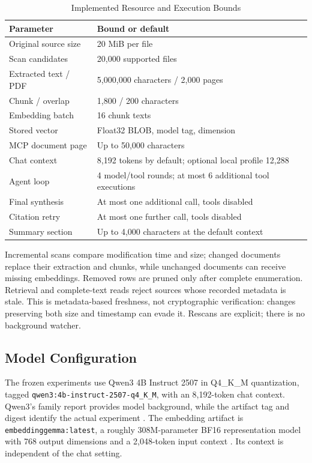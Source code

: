 \documentclass[conference,letterpaper]{IEEEtran}
\newcommand{\code}[1]{\texttt{#1}}
\begin{document}
\begin{table}[t]
\caption{Implemented Resource and Execution Bounds}
\label{tab:limits}
\centering\small
\begin{tabularx}{\columnwidth}{@{}lX@{}}
\toprule
Parameter & Bound or default \\
\midrule
Original source size & 20 MiB per file \\
Scan candidates & 20,000 supported files \\
Extracted text / PDF & 5,000,000 characters / 2,000 pages \\
Chunk / overlap & 1,800 / 200 characters \\
Embedding batch & 16 chunk texts \\
Stored vector & Float32 BLOB, model tag, dimension \\
MCP document page & Up to 50,000 characters \\
Chat context & 8,192 tokens by default; optional local profile 12,288 \\
Agent loop & 4 model/tool rounds; at most 6 additional tool executions \\
Final synthesis & At most one additional call, tools disabled \\
Citation retry & At most one further call, tools disabled \\
Summary section & Up to 4,000 characters at the default context \\
\bottomrule
\end{tabularx}
\end{table}

Incremental scans compare modification time and size; changed documents replace their extraction and chunks, while unchanged documents can receive missing embeddings. Removed rows are pruned only after complete enumeration. Retrieval and complete-text reads reject sources whose recorded metadata is stale. This is metadata-based freshness, not cryptographic verification: changes preserving both size and timestamp can evade it. Rescans are explicit; there is no background watcher.

\subsection{Model Configuration}
The frozen experiments use Qwen3 4B Instruct 2507 in Q4\_K\_M quantization, tagged \code{qwen3:4b-instruct-2507-q4\_K\_M}, with an 8,192-token chat context. Qwen3's family report provides model background, while the artifact tag and digest identify the actual experiment \cite{qwen}. The embedding artifact is \code{embeddinggemma:latest}, a roughly 308M-parameter BF16 representation model with 768 output dimensions and a 2,048-token input context \cite{gemma}. Its context is independent of the chat setting.
\end{document}
